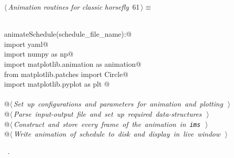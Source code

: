 \documentclass[11.5pt]{report}
\begin{document}
\begin{flushleft} \small
\begin{minipage}{\linewidth}\label{scrap92}\raggedright\small
{} $\langle\,${\itshape Animation routines for classic horsefly}\nobreak\ {\footnotesize {61}}$\,\rangle\equiv$
\vspace{-1ex}
\begin{list}{}{} \item
\mbox{}\verb@@\\
\mbox{}\verb@def animateSchedule(schedule_file_name):@\\
\mbox{}\verb@     import yaml@\\
\mbox{}\verb@     import numpy as np@\\
\mbox{}\verb@     import matplotlib.animation as animation@\\
\mbox{}\verb@     from matplotlib.patches import Circle@\\
\mbox{}\verb@     import matplotlib.pyplot as plt @\\
\mbox{}\verb@@\\
\mbox{}\verb@     @\hbox{$\langle\,${\itshape Set up configurations and parameters for animation and plotting}\nobreak\ {\footnotesize {}}$\,\rangle$}\verb@@\\
\mbox{}\verb@     @\hbox{$\langle\,${\itshape Parse input-output file and set up required data-structures}\nobreak\ {\footnotesize {}}$\,\rangle$}\verb@@\\
\mbox{}\verb@     @\hbox{$\langle\,${\itshape Construct and store every frame of the animation in \verb|ims|}\nobreak\ {\footnotesize {}}$\,\rangle$}\verb@@\\
\mbox{}\verb@     @\hbox{$\langle\,${\itshape Write animation of schedule to disk and display in live window}\nobreak\ {\footnotesize {}}$\,\rangle$}\verb@@\\
\mbox{}\verb@@{\NWsep}
\end{list}
\vspace{-1.5ex}
\footnotesize
\begin{list}{}{\setlength{\itemsep}{-\parsep}\setlength{\itemindent}{-\leftmargin}}
\item \NWtxtMacroRefIn\ .

\item{}
\end{list}
\end{minipage}\vspace{4ex}
\end{flushleft}
\end{document}
